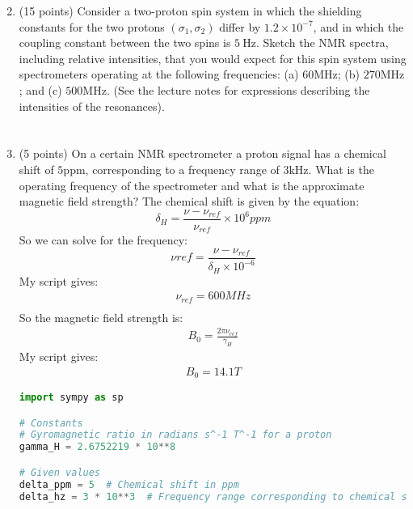 \documentclass[12pt]{article}
\begin{document}
\begin{enumerate}
  \setcounter{enumi}{1}
  \item (15 points) Consider a two-proton spin system in which the shielding constants for the two protons $\left(\sigma_{1}, \sigma_{2}\right)$ differ by $1.2 \times 10^{-7}$, and in which the coupling constant between the two spins is $5 \mathrm{~Hz}$. Sketch the NMR spectra, including relative intensities, that you would expect for this spin system using spectrometers operating at the following frequencies: (a) $60 \mathrm{MHz}$; (b) $270 \mathrm{MHz}$; and (c) $500 \mathrm{MHz}$. (See the lecture notes for expressions describing the intensities of the resonances).
\section{}
  \item (5 points) On a certain NMR spectrometer a proton signal has a chemical shift of $5 \mathrm{ppm}$, corresponding to a frequency range of $3 \mathrm{kHz}$. What is the operating frequency of the spectrometer and what is the approximate magnetic field strength?
  The chemical shift is given by the equation:
  \begin{equation}
    \delta _{H} = \frac{\nu - \nu_{ref}}{\nu_{ref}} \times 10^6 ppm
  \end{equation}
  So we can solve for the frequency:
  \begin{equation}
    \nu{ref} = \frac{\nu - \nu_{ref}}{\delta _{H} \times 10^{-6}}
  \end{equation}
My script gives:
\begin{align}
  \nu_{ref} = 600 MHz\\
\end{align}
So the magnetic field strength is:
\begin{align}
  B_0 = \frac{2\pi \nu_{ref}}{\gamma_H}
\end{align}
My script gives:
\begin{align}
  B_0 = 14.1 T
\end{align}
\begin{lstlisting}[language=Python]
import sympy as sp

# Constants
# Gyromagnetic ratio in radians s^-1 T^-1 for a proton
gamma_H = 2.6752219 * 10**8

# Given values
delta_ppm = 5  # Chemical shift in ppm
delta_hz = 3 * 10**3  # Frequency range corresponding to chemical shift in Hz


\end{lstlisting}
\end{enumerate}
\end{document}
